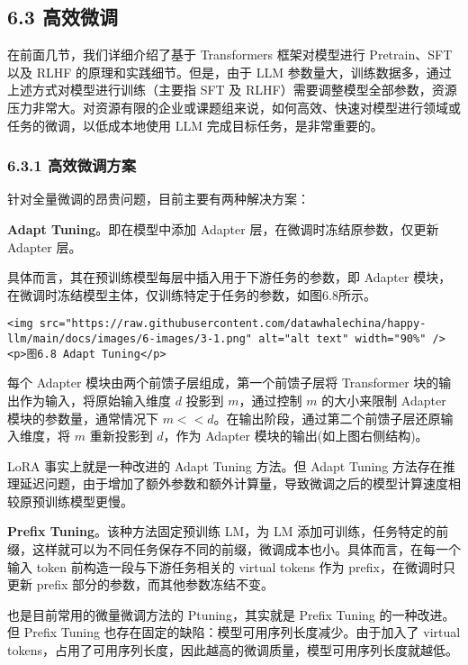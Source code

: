 \documentclass[
]{article}
\begin{document}
\subsection{6.3 高效微调}\label{ux9ad8ux6548ux5faeux8c03}

在前面几节，我们详细介绍了基于 Transformers 框架对模型进行 Pretrain、SFT
以及 RLHF 的原理和实践细节。但是，由于 LLM
参数量大，训练数据多，通过上述方式对模型进行训练（主要指 SFT 及
RLHF）需要调整模型全部参数，资源压力非常大。对资源有限的企业或课题组来说，如何高效、快速对模型进行领域或任务的微调，以低成本地使用
LLM 完成目标任务，是非常重要的。

\subsubsection{6.3.1
高效微调方案}\label{ux9ad8ux6548ux5faeux8c03ux65b9ux6848}

针对全量微调的昂贵问题，目前主要有两种解决方案：

\textbf{Adapt Tuning}。即在模型中添加 Adapter
层，在微调时冻结原参数，仅更新 Adapter 层。

具体而言，其在预训练模型每层中插入用于下游任务的参数，即 Adapter
模块，在微调时冻结模型主体，仅训练特定于任务的参数，如图6.8所示。

\begin{verbatim}
<img src="https://raw.githubusercontent.com/datawhalechina/happy-llm/main/docs/images/6-images/3-1.png" alt="alt text" width="90%" />
<p>图6.8 Adapt Tuning</p>
\end{verbatim}

每个 Adapter 模块由两个前馈子层组成，第一个前馈子层将 Transformer
块的输出作为输入，将原始输入维度 \(d\) 投影到 \(m\)，通过控制 \(m\)
的大小来限制 Adapter 模块的参数量，通常情况下
\(m << d\)。在输出阶段，通过第二个前馈子层还原输入维度，将 \(m\)
重新投影到 \(d\)，作为 Adapter 模块的输出(如上图右侧结构)。

LoRA 事实上就是一种改进的 Adapt Tuning 方法。但 Adapt Tuning
方法存在推理延迟问题，由于增加了额外参数和额外计算量，导致微调之后的模型计算速度相较原预训练模型更慢。

\textbf{Prefix Tuning}。该种方法固定预训练 LM，为 LM
添加可训练，任务特定的前缀，这样就可以为不同任务保存不同的前缀，微调成本也小。具体而言，在每一个输入
token 前构造一段与下游任务相关的 virtual tokens 作为
prefix，在微调时只更新 prefix 部分的参数，而其他参数冻结不变。

也是目前常用的微量微调方法的 Ptuning，其实就是 Prefix Tuning
的一种改进。但 Prefix Tuning
也存在固定的缺陷：模型可用序列长度减少。由于加入了 virtual
tokens，占用了可用序列长度，因此越高的微调质量，模型可用序列长度就越低。
\end{document}
